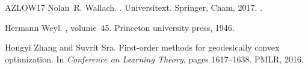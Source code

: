 \documentclass[10pt,a4paper]{article}
\numberwithin{equation}{section}
\begin{document}
\begin{thebibliography}{AZLOW17}
Nolan~R. Wallach.
.
\newblock Universitext. Springer, Cham, 2017.
\newblock \href {https://doi.org/10.1007/978-3-319-65907-7}
  {}.

Hermann Weyl.
,
  volume~45.
\newblock Princeton university press, 1946.

Hongyi Zhang and Suvrit Sra.
\newblock First-order methods for geodesically convex optimization.
\newblock In {\em Conference on Learning Theory}, pages 1617--1638. PMLR, 2016.

\end{thebibliography}
\end{document}
